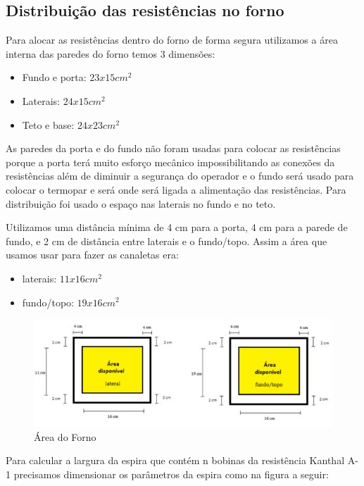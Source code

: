\subsection{Distribuição das resistências no forno}

Para alocar as resistências dentro do forno de forma segura utilizamos a área interna das paredes do forno temos 3 dimensões:
\begin{itemize}
	\item Fundo e porta: $23x15 cm^2$
	\item Laterais: $24x15cm^2$
	\item Teto e base: $24x23cm^2$
\end{itemize}


As paredes da porta e do fundo não foram usadas para colocar as resistências porque a porta terá muito esforço mecânico impossibilitando as conexões da resistências além de diminuir a segurança do operador e o fundo será usado para colocar o termopar e será onde será ligada a alimentação das resistências. Para distribuição foi usado o espaço nas laterais no fundo e no teto.

Utilizamos uma distância mínima de 4 cm para a porta, 4 cm para a parede de fundo, e 2 cm de distância entre laterais e o fundo/topo. Assim a área que usamos usar para fazer as canaletas era:
\begin{itemize}
	\item laterais: $11x16cm^2$
	\item fundo/topo: $19x16cm^2$
\end{itemize}

\begin{figure}[!ht]
	\centering
	\label{areaforno}
	\includegraphics[keepaspectratio=true,scale=1.0]{figuras/alimentacao2.JPG}
	\caption{Área do Forno}
\end{figure}

Para calcular a largura da espira que contém n bobinas da resistência Kanthal A-1 precisamos dimensionar os parâmetros da espira como na figura a seguir:

